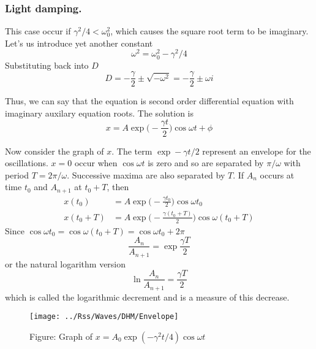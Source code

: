 \documentclass[../main.tex]{subfiles}
\begin{document}
\subsubsection*{Light damping.} This case occur if $\gamma^2/4<\omega_0^2$, which causes the square root term to be imaginary. Let's us introduce yet another constant
\begin{equation*}
    \omega^2=\omega_0^2-\gamma^2/4
\end{equation*}
Substituting back into $D$
\begin{equation*}
    D=-\frac{\gamma}{2}\pm \sqrt{-\omega^2}=-\frac{\gamma}{2}\pm \omega i
\end{equation*}

Thus, we can say that the equation is second order differential equation with imaginary auxilary equation roots. The solution is
\begin{equation*}
    x=A\exp\biggl(-\frac{\gamma t}{2}\biggr)\cos\omega t +\phi
\end{equation*} 

Now consider the graph of $x$. The term $\exp -\gamma t/2$ represent an envelope for the oscillations. $x=0$ occur when $\cos\omega t$ is zero and so are separated by $\pi/\omega$ with period $T=2\pi/\omega$. Successive maxima are also separated by $T$. If $A_n$ occurs at time $t_0$ and $A_{n+1}$ at $t_0+T$, then 
\begin{align*}
    x(t_0)&=A\exp\biggl(-\frac{\gamma t_0}{2}\biggr)\cos\omega t_0\\
    x(t_0+T)&=A\exp\biggl(-\frac{\gamma (t_0+T)}{2}\biggr)\cos\omega (t_0+T)
\end{align*}
Since $\cos\omega t_0=\cos\omega (t_0+T)=\cos\omega t_0+2\pi$
\begin{equation*}
    \frac{A_n}{A_{n+1}}=\exp \frac{\gamma T}{2}
\end{equation*} 
or the natural logarithm version
\begin{equation*}
    \ln \frac{A_n}{A_{n+1}}=\frac{\gamma T}{2}
\end{equation*}
which is called the logarithmic decrement and is a measure of this decrease. 
\begin{figure*}[b]
    \centering
    \texttt{[image: ../Rss/Waves/DHM/Envelope]}
    \caption*{Figure: Graph of $x=A_0\exp(-\gamma^2t/4)\cos \omega t$}
\end{figure*}
\end{document}

